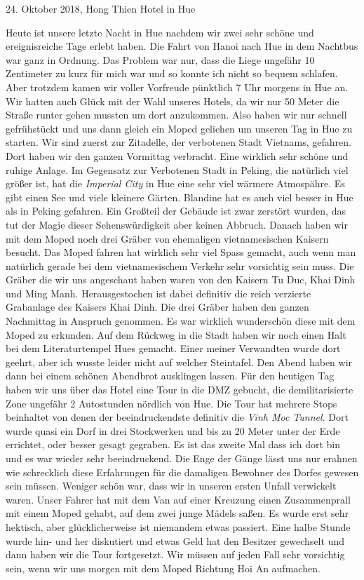 \documentclass[11pt]{book}
\begin{document}
24. Oktober 2018, Hong Thien Hotel in Hue

Heute ist unsere letzte Nacht in Hue nachdem wir zwei sehr schöne und ereignisreiche Tage erlebt haben. Die Fahrt
von Hanoi nach Hue in dem Nachtbus war ganz in Ordnung. Das Problem war nur, dass die Liege ungefähr 10 Zentimeter
zu kurz für mich war und so konnte ich nicht so bequem schlafen. Aber trotzdem kamen wir voller Vorfreude pünktlich 
7 Uhr morgens in Hue an. Wir hatten auch Glück mit der Wahl unseres Hotels, da wir nur 50 Meter die Straße runter 
gehen mussten um dort anzukommen. Also haben wir nur schnell gefrühstückt und uns dann gleich ein Moped geliehen 
um unseren Tag in Hue zu starten. Wir sind zuerst zur Zitadelle, der verbotenen Stadt Vietnams, gefahren. Dort 
haben wir den ganzen Vormittag verbracht. Eine wirklich sehr schöne und ruhige Anlage. Im Gegensatz zur Verbotenen 
Stadt in Peking, die natürlich viel größer ist, hat die \emph{Imperial City} in Hue eine sehr viel wärmere Atmospähre.
Es gibt einen See und viele kleinere Gärten. Blandine hat es auch viel besser in Hue als in Peking gefahren. 
Ein Großteil der Gebäude ist zwar zerstört wurden, das tut der Magie dieser Sehenswürdigkeit aber keinen Abbruch.
Danach haben wir mit dem Moped noch drei Gräber von ehemaligen vietnamesischen Kaisern besucht. Das Moped fahren 
hat wirklich sehr viel Spass gemacht, auch wenn man natürlich gerade bei dem vietnamesischem Verkehr sehr vorsichtig 
sein muss. Die Gräber die wir uns angeschaut haben waren von den Kaisern Tu Duc, Khai Dinh und Ming Manh. Herausgestochen 
ist dabei definitiv die reich verzierte Grabanlage des Kaisers Khai Dinh. Die drei Gräber haben den ganzen Nachmittag 
in Anspruch genommen. Es war wirklich wunderschön diese mit dem Moped zu erkunden. Auf dem Rückweg in die Stadt 
haben wir noch einen Halt bei dem Literaturtempel Hues gemacht. Einer meiner Verwandten wurde dort geehrt, aber
ich wusste leider nicht auf welcher Steintafel. Den Abend haben wir dann bei einem schönen Abendbrot ausklingen lassen.
Für den heutigen Tag haben wir uns über das Hotel eine Tour in die DMZ gebucht, die demilitarisierte Zone ungefähr 
2 Autostunden nördlich von Hue. Die Tour hat mehrere Stops beinhaltet von denen der beeindruckendste definitiv die 
\emph{Vinh Moc Tunnel}. Dort wurde quasi ein Dorf in drei Stockwerken und bis zu 20 Meter unter der Erde errichtet, 
oder besser gesagt gegraben. Es ist das zweite Mal dass ich dort bin und es war wieder sehr beeindruckend. Die Enge 
der Gänge lässt uns nur erahnen wie schrecklich diese Erfahrungen für die damaligen Bewohner des Dorfes gewesen sein müssen.
Weniger schön war, dass wir in unseren ersten Unfall verwickelt waren. Unser Fahrer hat mit dem Van auf einer Kreuzung 
einen Zusammenprall mit einem Moped gehabt, auf dem zwei junge Mädels saßen. Es wurde erst sehr hektisch, aber glücklicherweise 
ist niemandem etwas passiert. Eine halbe Stunde wurde hin- und her diskutiert und etwas Geld hat den Besitzer gewechselt
und dann haben wir die Tour fortgesetzt. Wir müssen auf jeden Fall sehr vorsichtig sein, wenn wir uns morgen mit dem 
Moped Richtung Hoi An aufmachen.
\end{document}
